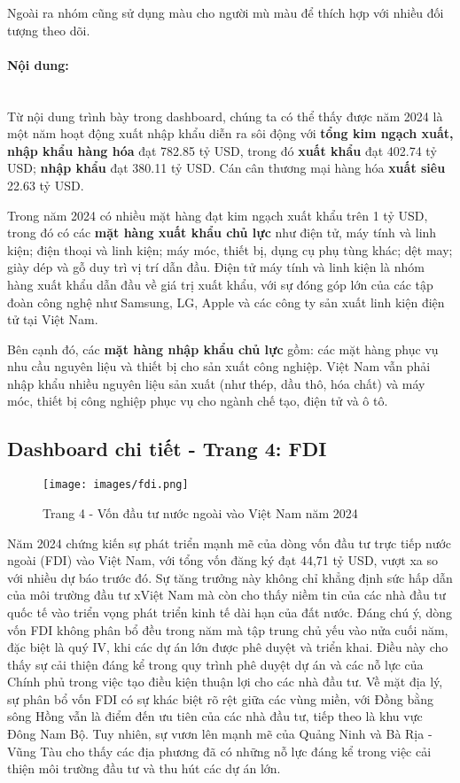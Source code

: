 \documentclass[a4paper]{report}
\begin{document}
{{Ngoài ra nhóm cũng sử dụng màu cho người mù màu để thích hợp với nhiều đối tượng theo dõi.

\paragraph{Nội dung:} \mbox{}\\
Từ nội dung trình bày trong dashboard, chúng ta có thể thấy được năm 2024 là một năm hoạt động xuất nhập khẩu diễn ra sôi động với \textbf{tổng kim ngạch xuất, nhập khẩu hàng hóa} đạt 782.85 tỷ USD, trong đó \textbf{xuất khẩu} đạt 402.74 tỷ USD; \textbf{nhập khẩu} đạt 380.11 tỷ USD. Cán cân thương mại hàng hóa \textbf{xuất siêu} 22.63 tỷ USD.

Trong năm 2024 có nhiều mặt hàng đạt kim ngạch xuất khẩu trên 1 tỷ USD, trong đó có các \textbf{mặt hàng xuất khẩu chủ lực} như điện tử, máy tính và linh kiện; điện thoại và linh kiện; máy móc, thiết bị, dụng cụ phụ tùng khác; dệt may; giày dép và gỗ duy trì vị trí dẫn đầu. Điện tử máy tính và linh kiện là nhóm hàng xuất khẩu dẫn đầu về giá trị xuất khẩu, với sự đóng góp lớn của các tập đoàn công nghệ như Samsung, LG, Apple và các công ty sản xuất linh kiện điện tử tại Việt Nam.

Bên cạnh đó, các \textbf{mặt hàng nhập khẩu chủ lực} gồm: các mặt hàng phục vụ nhu cầu nguyên liệu và thiết bị cho sản xuất công nghiệp. Việt Nam vẫn phải nhập khẩu nhiều nguyên liệu sản xuất (như thép, dầu thô, hóa chất) và máy móc, thiết bị công nghiệp phục vụ cho ngành chế tạo, điện tử và ô tô. 

\subsection{Dashboard chi tiết - Trang 4: FDI}
\begin{figure}[H]
    \centering
    \texttt{[image: images/fdi.png]}
    \caption{Trang 4 - Vốn đầu tư nước ngoài vào Việt Nam năm 2024}
    \label{fig:enter-label}
\end{figure}

Năm 2024 chứng kiến sự phát triển mạnh mẽ của dòng vốn đầu tư trực tiếp nước ngoài (FDI) vào Việt Nam, với tổng vốn đăng ký đạt 44,71 tỷ USD, vượt xa so với nhiều dự báo trước đó\cite{ref}.
Sự tăng trưởng này không chỉ khẳng định sức hấp dẫn của môi trường đầu tư xViệt Nam mà còn cho thấy niềm tin của các nhà đầu tư quốc tế vào triển vọng phát triển kinh tế dài hạn của đất nước. Đáng chú ý, dòng vốn FDI không phân bổ đều trong năm mà tập trung chủ yếu vào nửa cuối năm, đặc biệt là quý IV, khi các dự án lớn được phê duyệt và triển khai. Điều này cho thấy sự cải thiện đáng kể trong quy trình phê duyệt dự án và các nỗ lực của Chính phủ trong việc tạo điều kiện thuận lợi cho các nhà đầu tư. Về mặt địa lý, sự phân bổ vốn FDI có sự khác biệt rõ rệt giữa các vùng miền, với Đồng bằng sông Hồng vẫn là điểm đến ưu tiên của các nhà đầu tư, tiếp theo là khu vực Đông Nam Bộ. Tuy nhiên, sự vươn lên mạnh mẽ của Quảng Ninh và Bà Rịa - Vũng Tàu cho thấy các địa phương đã có những nỗ lực đáng kể trong việc cải thiện môi trường đầu tư và thu hút các dự án lớn.\\

}}
\end{document}
